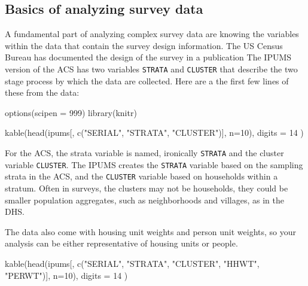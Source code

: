\documentclass[
]{article}
\newenvironment{Shaded}{\begin{snugshade}}{\end{snugshade}}
\newcommand{\AttributeTok}[1]{\textcolor[rgb]{0.77,0.63,0.00}{#1}}
\newcommand{\DecValTok}[1]{\textcolor[rgb]{0.00,0.00,0.81}{#1}}
\newcommand{\FunctionTok}[1]{\textcolor[rgb]{0.00,0.00,0.00}{#1}}
\newcommand{\NormalTok}[1]{#1}
\newcommand{\StringTok}[1]{\textcolor[rgb]{0.31,0.60,0.02}{#1}}
\begin{document}
\hypertarget{basics-of-analyzing-survey-data}{%
\subsection{Basics of analyzing survey data}\label{basics-of-analyzing-survey-data}}

A fundamental part of analyzing complex survey data are knowing the variables within the data that contain the survey design information. The US Census Bureau has documented the design of the survey in a publication \citep{uscensusbureau2014} The IPUMS version of the ACS has two variables \texttt{STRATA} and \texttt{CLUSTER} that describe the two stage process by which the data are collected. Here are a the first few lines of these from the data:

\begin{Shaded}
\begin{Highlighting}[]
\FunctionTok{options}\NormalTok{(}\AttributeTok{scipen =} \DecValTok{999}\NormalTok{)}
\FunctionTok{library}\NormalTok{(knitr)}
  
\FunctionTok{kable}\NormalTok{(}\FunctionTok{head}\NormalTok{(ipums[, }\FunctionTok{c}\NormalTok{(}\StringTok{"SERIAL"}\NormalTok{, }\StringTok{"STRATA"}\NormalTok{, }\StringTok{"CLUSTER"}\NormalTok{)],}
           \AttributeTok{n=}\DecValTok{10}\NormalTok{),}
      \AttributeTok{digits =} \DecValTok{14}\NormalTok{ )}
\end{Highlighting}
\end{Shaded}

For the ACS, the strata variable is named, ironically \texttt{STRATA} and the cluster variable \texttt{CLUSTER}. The IPUMS creates the \texttt{STRATA} variable based on the sampling strata in the ACS, and the \texttt{CLUSTER} variable based on households within a stratum. Often in surveys, the clusters may not be households, they could be smaller population aggregates, such as neighborhoods and villages, as in the DHS.

The data also come with housing unit weights and person unit weights, so your analysis can be either representative of housing units or people.

\begin{Shaded}
\begin{Highlighting}[]
\FunctionTok{kable}\NormalTok{(}\FunctionTok{head}\NormalTok{(ipums[, }\FunctionTok{c}\NormalTok{(}\StringTok{"SERIAL"}\NormalTok{, }\StringTok{"STRATA"}\NormalTok{, }\StringTok{"CLUSTER"}\NormalTok{, }\StringTok{"HHWT"}\NormalTok{, }\StringTok{"PERWT"}\NormalTok{)],}
           \AttributeTok{n=}\DecValTok{10}\NormalTok{),}
      \AttributeTok{digits =} \DecValTok{14}\NormalTok{ )}
\end{Highlighting}
\end{Shaded}
\end{document}
